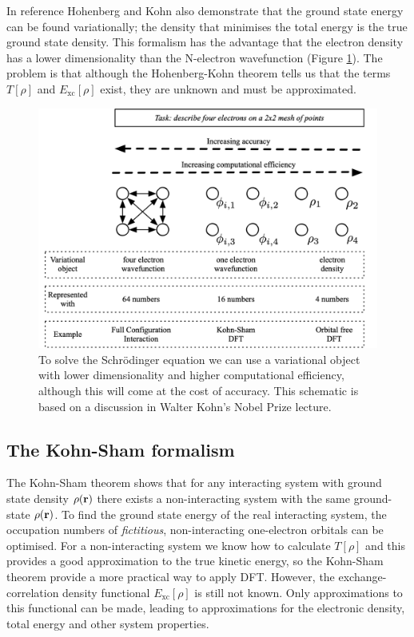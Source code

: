 In reference \cite{Hohenberg1964} Hohenberg and Kohn also demonstrate that the ground state energy can be found variationally; the density that minimises the total energy is the true ground state density. This formalism has the advantage that the electron density has a lower dimensionality than the N-electron wavefunction (Figure \ref{dimensions}). The problem is that although the Hohenberg-Kohn theorem tells us that the terms $T\left[\rho\right]$ and $E_{\textrm{xc}}\left[\rho\right]$ exist, they are unknown and must be approximated.

\begin{figure}[h]
\centering
  \includegraphics[width=0.8\columnwidth]{figures/ch3/dimensions.png}
  \caption[Dimensionality of variational objects]{To solve the Schr\"{o}dinger equation we can use a variational object with lower dimensionality and higher computational efficiency, although this will come at the cost of accuracy. This schematic is based on a discussion in Walter Kohn's Nobel Prize lecture.\autocite{Kohn1999}}
  \label{dimensions}
\end{figure}


\subsection{The Kohn-Sham formalism} 

The Kohn-Sham theorem shows that for any interacting system with ground state density $\rho(\textbf{\textrm{r}})$ there exists a non-interacting system with the same ground-state $\rho(\textbf{\textrm{r}})$. To find the ground state energy of the real interacting system, the occupation numbers of \textit{fictitious}, non-interacting one-electron orbitals can be optimised. For a non-interacting system we know how to calculate $T\left[\rho\right]$ and this provides a good approximation to the true kinetic energy, so the Kohn-Sham theorem provide a more practical way to apply DFT. However, the exchange-correlation density functional $E_{\textrm{xc}}\left[\rho\right]$ is still not known. Only approximations to this functional can be made, leading to approximations for the electronic density, total energy and other system properties.


